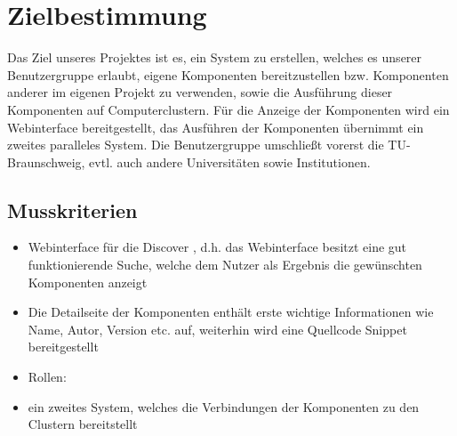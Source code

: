
\chapter{Zielbestimmung}



Das Ziel unseres Projektes ist es, ein System zu erstellen, welches es unserer Benutzergruppe erlaubt, eigene Komponenten bereitzustellen bzw. Komponenten anderer im eigenen Projekt zu verwenden, sowie die Ausführung dieser Komponenten auf Computerclustern. Für die Anzeige der Komponenten wird ein Webinterface bereitgestellt, das Ausführen der Komponenten übernimmt ein zweites paralleles System.
Die Benutzergruppe umschließt vorerst die TU-Braunschweig, evtl. auch andere Universitäten sowie Institutionen. 
 

\section{Musskriterien}


\begin{itemize}
\item Webinterface für die \glqq Discover \grqq , d.h. das Webinterface besitzt eine gut funktionierende Suche, welche dem Nutzer als Ergebnis die gewünschten Komponenten anzeigt
\item Die Detailseite der Komponenten enthält erste wichtige Informationen wie Name, Autor, Version etc. auf, weiterhin wird eine Quellcode
Snippet bereitgestellt
\item Rollen: 
\item ein zweites System, welches die Verbindungen der Komponenten zu den Clustern bereitstellt
\end{itemize}

